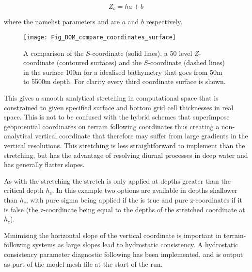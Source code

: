 \documentclass[../main/NEMO_manual]{subfiles}
\begin{document}
\[
  Z_b = h a + b
\]

where the namelist parameters  and  are $a$ and $b$ respectively.

\begin{figure}[!ht]
   \texttt{[image: Fig\_DOM\_compare\_coordinates\_surface]}
   \caption{
     A comparison of the \citet{Song_Haidvogel_JCP94} $S$-coordinate (solid lines),
     a 50 level $Z$-coordinate (contoured surfaces) and
     the \citet{Siddorn_Furner_OM12} $S$-coordinate (dashed lines) in
     the surface 100m for a idealised bathymetry that goes from 50m to 5500m depth.
     For clarity every third coordinate surface is shown.
   }
   \label{fig:fig_compare_coordinates_surface}
\end{figure}

This gives a smooth analytical stretching in computational space that is constrained to
given specified surface and bottom grid cell thicknesses in real space.
This is not to be confused with the hybrid schemes that
superimpose geopotential coordinates on terrain following coordinates thus
creating a non-analytical vertical coordinate that
therefore may suffer from large gradients in the vertical resolutions.
This stretching is less straightforward to implement than the \citet{Song_Haidvogel_JCP94} stretching,
but has the advantage of resolving diurnal processes in deep water and has generally flatter slopes.

As with the \citet{Song_Haidvogel_JCP94} stretching the stretch is only applied at depths greater than
the critical depth $h_c$.
In this example two options are available in depths shallower than $h_c$,
with pure sigma being applied if the  is true and pure z-coordinates if it is false
(the z-coordinate being equal to the depths of the stretched coordinate at $h_c$).

Minimising the horizontal slope of the vertical coordinate is important in terrain-following systems as
large slopes lead to hydrostatic consistency.
A hydrostatic consistency parameter diagnostic following \citet{Haney1991} has been implemented,
and is output as part of the model mesh file at the start of the run.

\end{document}
